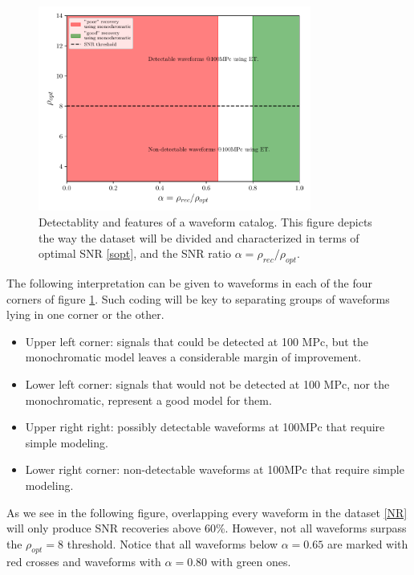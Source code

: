 \begin{figure}[hbt!]
\begin{center}
\includegraphics[width=0.8\textwidth, angle=0]{images/Data_analysis/results/schematics.pdf}
\captionsetup{width=0.8\textwidth}
\caption[Detectablity and features of a waveform catalog]{Detectablity and features of a waveform catalog. This figure depicts the way the dataset will be divided and characterized in terms of optimal SNR \ref{sopt}, and the SNR ratio $\alpha=\rho_{rec}/\rho_{opt}$.}
\label{regions}
\end{center} 
\end{figure}

\FloatBarrier


The following interpretation can be given to waveforms in each of the four corners of figure \ref{regions}. Such coding will be key to separating groups of waveforms lying in one corner or the other.


\begin{itemize}
\item Upper left corner: signals that could be detected at 100 MPc, but the monochromatic model leaves a considerable margin of improvement.
\item Lower left corner: signals that would not be detected at 100 MPc, nor the monochromatic, represent a good model for them.
\item 
Upper right right: possibly detectable waveforms at 100MPc that require simple modeling.
\item 
Lower right corner: non-detectable waveforms at 100MPc that require simple modeling.
\end{itemize}


As we see in the following figure, overlapping every waveform in the dataset \ref{NR} will only produce SNR recoveries above 60\%. However, not all waveforms surpass the $\rho_{opt}=8$ threshold. Notice that all waveforms below $\alpha=0.65$ are marked with red crosses and waveforms with $\alpha=0.80$ with green ones.

